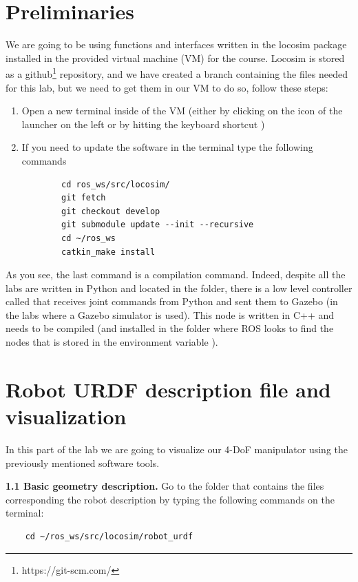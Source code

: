 \documentclass[11pt]{article}
\begin{document}
%
\section{Preliminaries}
We are going to be using functions and interfaces written in the locosim package installed in the provided virtual machine (VM) for the course. Locosim is stored as a github\footnote{https://git-scm.com/} repository, and we have created a branch containing the files needed for this lab, but we need to get them in our VM to do so, follow these steps:

\begin{enumerate}
	\item Open a new terminal inside of the VM (either by clicking on the icon of the launcher on the left or by hitting the keyboard shortcut )
	\item If you need to update the software in the terminal type the following commands
	
	\begin{verbatim}
		cd ros_ws/src/locosim/
		git fetch 
		git checkout develop
		git submodule update --init --recursive
		cd ~/ros_ws
		catkin_make install
	\end{verbatim}

\end{enumerate}

As you see, the last command is a compilation command. Indeed, despite all the labs are written in Python and located in the  folder, there is a low level controller called  that receives joint commands from Python and sent them to Gazebo (in the labs where a Gazebo simulator is used). This node is written in C++ and needs to be compiled (and installed in the folder where ROS looks to find the nodes that is stored in the environment variable  ). 
%
\section{Robot URDF description file and visualization}
%
In this part of the lab we are going to visualize our 4-DoF manipulator using the previously mentioned software tools.

\textbf{1.1 Basic geometry description.} Go to the folder that contains the files corresponding the robot description by typing the following commands on the terminal:


\begin{verbatim}
	cd ~/ros_ws/src/locosim/robot_urdf
\end{verbatim}
\end{document}
